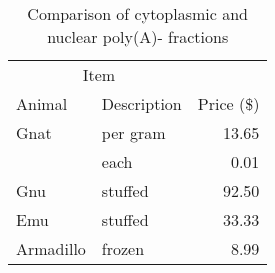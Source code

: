 \begin{table}
	\centering
	\caption{Comparison of cytoplasmic and nuclear poly(A)- fractions}
	\begin{tabular}{llr}
		\toprule
		\multicolumn{2}{c}{Item} \\
		\cmidrule(r){1-2}
		Animal & Description & Price (\$) \\
		\midrule
		Gnat  & per gram & 13.65 \\
			  & each     &  0.01 \\
		Gnu   & stuffed  & 92.50 \\
		Emu   & stuffed  & 33.33 \\
		Armadillo & frozen & 8.99 \\
		\bottomrule
	\end{tabular}
\end{table}
